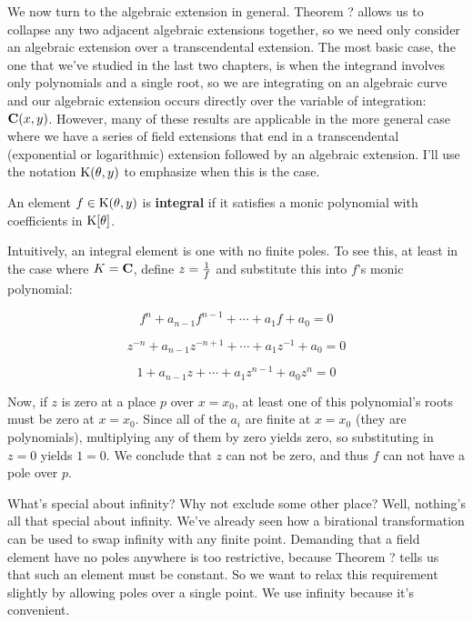 
\setcounter{chapter}{8}

We now turn to the algebraic extension in general.  Theorem ? allows
us to collapse any two adjacent algebraic extensions together, so we
need only consider an algebraic extension over a transcendental
extension.  The most basic case, the one that we've studied in the
last two chapters, is when the integrand involves only polynomials and
a single root, so we are integrating on an algebraic curve and our
algebraic extension occurs directly over the variable of integration:
${\bf C}(x,y)$.  However, many of these results are applicable in the
more general case where we have a series of field extensions that end
in a transcendental (exponential or logarithmic) extension followed by
an algebraic extension.  I'll use the notation ${\rm K}(\theta, y)$ to
emphasize when this is the case.



An element $f \in {\rm K}(\theta,y)$ is {\bf integral} if it satisfies a
monic polynomial with coefficients in ${\rm K}[\theta]$.

\enddefinition

Intuitively, an integral element is one with no finite poles.
To see this, at least in the case where $K = {\bf C}$, define
$z = {1 \over f}$ and substitute this into $f$'s monic polynomial:

	$$f^n + a_{n-1} f^{n-1} + \cdots + a_1 f + a_0 = 0$$

	$$z^{-n} + a_{n-1} z^{-n+1} + \cdots + a_1 z^{-1} + a_0 = 0$$

	$$1 + a_{n-1} z + \cdots + a_1 z^{n-1} + a_0 z^n = 0$$

Now, if $z$ is zero at a place $p$ over $x=x_0$, at least one of this
polynomial's roots must be zero at $x=x_0$.  Since all of the $a_i$
are finite at $x=x_0$ (they are polynomials), multiplying any of them
by zero yields zero, so substituting in $z=0$ yields $1=0$. We
conclude that $z$ can not be zero, and thus $f$ can not have a pole
over $p$.

What's special about infinity?  Why not exclude some other place?
Well, nothing's all that special about infinity.  We've already seen
how a birational transformation can be used to swap infinity with any
finite point.  Demanding that a field element have no poles anywhere
is too restrictive, because Theorem ? tells us that such an element
must be constant.  So we want to relax this requirement slightly by
allowing poles over a single point.  We use infinity because it's
convenient.

